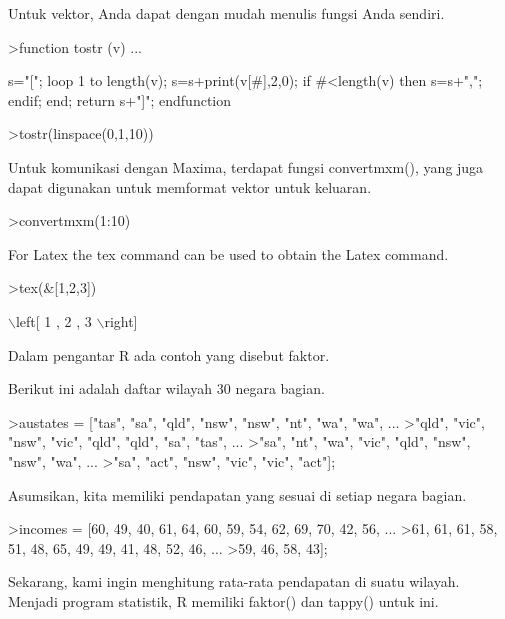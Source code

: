 \documentclass[a4paper,10pt]{article}
\begin{document}
\begin{eulernotebook}
\begin{eulercomment}
\begin{eulercomment}
\begin{eulercomment}
Untuk vektor, Anda dapat dengan mudah menulis fungsi Anda sendiri.
\end{eulercomment}
\begin{eulerprompt}
>function tostr (v) ...
\end{eulerprompt}
\begin{eulerudf}
  s="[";
  loop 1 to length(v);
     s=s+print(v[#],2,0);
     if #<length(v) then s=s+","; endif;
  end;
  return s+"]";
  endfunction
\end{eulerudf}
\begin{eulerprompt}
>tostr(linspace(0,1,10))
\end{eulerprompt}
\begin{euleroutput}
  [0.00,0.10,0.20,0.30,0.40,0.50,0.60,0.70,0.80,0.90,1.00]
\end{euleroutput}
\begin{eulercomment}
Untuk komunikasi dengan Maxima, terdapat fungsi convertmxm(), yang
juga dapat digunakan untuk memformat vektor untuk keluaran.
\end{eulercomment}
\begin{eulerprompt}
>convertmxm(1:10)
\end{eulerprompt}
\begin{euleroutput}
  [1,2,3,4,5,6,7,8,9,10]
\end{euleroutput}
\begin{eulercomment}
For Latex the tex command can be used to obtain the Latex command.
\end{eulercomment}
\begin{eulerprompt}
>tex(&[1,2,3])
\end{eulerprompt}
\begin{euleroutput}
  \(\backslash\)left[ 1 , 2 , 3 \(\backslash\)right] 
\end{euleroutput}
\begin{eulercomment}
Dalam pengantar R ada contoh yang disebut faktor.

Berikut ini adalah daftar wilayah 30 negara bagian.
\end{eulercomment}
\begin{eulerprompt}
>austates = ["tas", "sa", "qld", "nsw", "nsw", "nt", "wa", "wa", ...
>"qld", "vic", "nsw", "vic", "qld", "qld", "sa", "tas", ...
>"sa", "nt", "wa", "vic", "qld", "nsw", "nsw", "wa", ...
>"sa", "act", "nsw", "vic", "vic", "act"];
\end{eulerprompt}
\begin{eulercomment}
Asumsikan, kita memiliki pendapatan yang sesuai di setiap negara
bagian.
\end{eulercomment}
\begin{eulerprompt}
>incomes = [60, 49, 40, 61, 64, 60, 59, 54, 62, 69, 70, 42, 56, ...
>61, 61, 61, 58, 51, 48, 65, 49, 49, 41, 48, 52, 46, ...
>59, 46, 58, 43];
\end{eulerprompt}
\begin{eulercomment}
Sekarang, kami ingin menghitung rata-rata pendapatan di suatu wilayah.
Menjadi program statistik, R memiliki faktor() dan tappy() untuk ini.


\end{eulercomment}
\end{eulercomment}
\end{eulercomment}
\end{eulernotebook}
\end{document}
